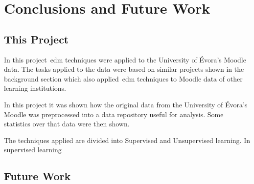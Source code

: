 \chapter{Conclusions and Future Work}
\label{sec:final}

\section{This Project}
\TODO{}

In this project~\gls{edm} techniques were applied to the University of Évora's
Moodle data. The tasks applied to the data were based on similar projects shown
in the background section which also applied~\gls{edm} techniques to Moodle
data of other learning institutions.

In this project it was shown how the original data from the University of
Évora's Moodle was preprocessed into a data repository useful for analysis.
Some statistics over that data were then shown.

The techniques applied are divided into Supervised and Unsupervised learning. In supervised learning 

\section{Future Work}
\TODO{}

